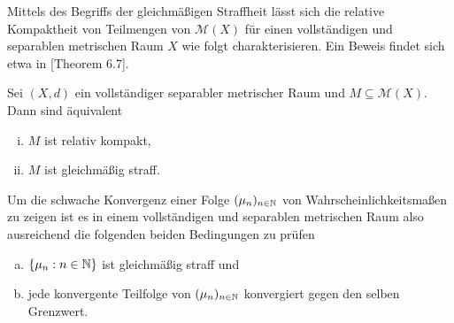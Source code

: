 Mittels des Begriffs der gleichmäßigen Straffheit lässt sich die relative Kompaktheit von Teilmengen von $\mathcal{M}(X)$ für einen vollständigen und separablen metrischen Raum $X$ wie folgt charakterisieren. Ein Beweis findet sich etwa in \cite{parthasarathy}[Theorem 6.7]. 

\begin{theorem}
    Sei $(X,d)$ ein vollständiger separabler metrischer Raum und $M \subseteq \mathcal{M}(X)$. Dann sind äquivalent
    \begin{enumerate}[(i)]
        \item $M$ ist relativ kompakt,
        \item $M$ ist gleichmäßig straff. 
    \end{enumerate}
\end{theorem}

Um die schwache Konvergenz einer Folge $(\mu_n)_{n \in \mathbb{N}}$ von Wahrscheinlichkeitsmaßen zu zeigen ist es in einem vollständigen und separablen metrischen Raum also ausreichend die folgenden beiden Bedingungen zu prüfen
\begin{enumerate}[(a)]
    \item $\{\mu_n: n \in \mathbb{N}\}$ ist gleichmäßig straff und
    \item jede konvergente Teilfolge von $(\mu_n)_{n \in \mathbb{N}}$ konvergiert gegen den selben Grenzwert.
\end{enumerate}
